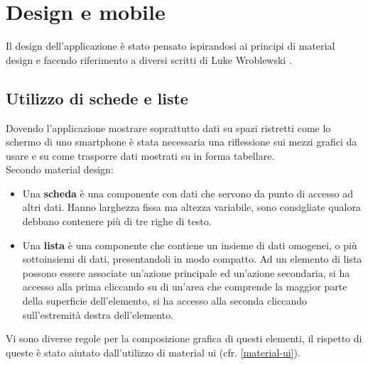 \section{Design e  mobile}
Il design dell'applicazione è stato pensato ispirandosi ai principi di material design
e facendo riferimento a diversi scritti di Luke Wroblewski \cite{lukew}.

\subsection{Utilizzo di schede e liste}\label{schede-liste}
Dovendo l'applicazione mostrare soprattutto dati su spazi ristretti come lo schermo
di uno smartphone è stata necessaria una riflessione sui mezzi grafici da usare e
su come trasporre dati mostrati su \fiscoloWeb{} in forma tabellare. \\

Secondo material design:
\begin{itemize}
\item Una \textbf{scheda} è una componente con dati che servono da punto di accesso
ad altri dati. Hanno larghezza fissa ma altezza variabile, sono consigliate qualora
debbano contenere più di tre righe di testo.
\item Una \textbf{lista} è una componente che contiene un insieme di dati omogenei,
o più sottoinsiemi di dati, presentandoli in modo compatto. Ad un elemento di lista
possono essere associate un'azione principale ed un'azione secondaria, si ha accesso
alla prima cliccando su di un'area che comprende la maggior parte della superficie
dell'elemento, si ha accesso alla seconda cliccando sull'estremità destra dell'elemento.
\end{itemize}

Vi sono diverse regole per la composizione grafica di questi elementi, il rispetto
di queste è stato aiutato dall'utilizzo di material ui (cfr. \ref{material-ui}). \\

